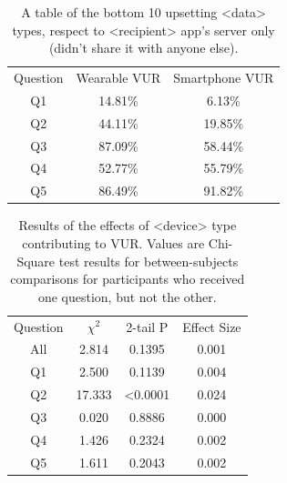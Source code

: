 \documentclass{acm_proc_article-sp}
\begin{document}
\begin{table}%
\begin{center}
\begin{tabular}{| c | c | c |}
 Question &  Wearable VUR & Smartphone VUR \\
Q1 & 14.81\%  &  6.13\%\\
Q2 & 44.11\%  &  19.85\%\\
Q3 & 87.09\%  &  58.44\%\\
Q4 & 52.77\%  & 55.79\%\\
Q5 & 86.49\%  &  91.82\%\\ 
\end{tabular}
\caption{A table of the bottom 10 upsetting <data> types, respect to <recipient> app's server only (didn't share it with anyone else).}
\label{deviceVUR}
\end{center}
\end{table}

\begin{table}%
\begin{center}
\begin{tabular}{| c | c | c | c |}
Question & $\chi^2$ &	2-tail P & Effect Size\\
All & 2.814 & 0.1395 & 0.001\\
Q1 & 2.500 & 0.1139 & 0.004\\
Q2 & 17.333 & <0.0001 & 0.024\\
Q3 & 0.020 & 0.8886 & 0.000\\
Q4 & 1.426 & 0.2324 & 0.002\\
Q5 & 1.611 & 0.2043 & 0.002\\
\end{tabular}
\caption{Results of the effects of <device> type contributing to VUR. Values are Chi-Square test results for between-subjects comparisons for participants who received one question, but not the other.}
\label{betweendevice}
\end{center}
\end{table}
\end{document}
